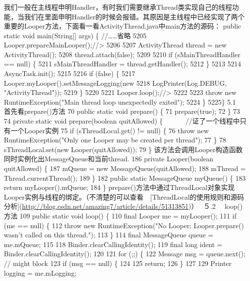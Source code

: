 \documentclass[9pt, b5paper]{article}
\begin{document}
\subsubsection{}
\label{sec-6-0-5}
我们一般在主线程申明Handler，有时我们需要继承Thread类实现自己的线程功能，当我们在里面申明Handler的时候会报错。其原因是主线程中已经实现了两个重要的Looper方法，下面看一看ActivityThread.java中main方法的源码：
public static void main(String[] args) \{
            //\ldots{}\ldots{}省略
5205        Looper.prepareMainLooper();//>
5206
5207        ActivityThread thread = new ActivityThread();
5208        thread.attach(false);
5209
5210        if (sMainThreadHandler == null) \{
5211            sMainThreadHandler = thread.getHandler();
5212        \}
5213
5214        AsyncTask.init();
5215
5216        if (false) \{
5217            Looper.myLooper().setMessageLogging(new
5218   LogPrinter(Log.DEBUG, "ActivityThread"));
5219        \}
5220
5221        Looper.loop();//>
5222
5223        throw new RuntimeException("Main thread loop unexpectedly exited");
5224    \}
5225\}
5.1　首先看prepare()方法
70     public static void prepare() \{
71         prepare(true);
72     \}
73 
74     private static void prepare(boolean quitAllowed) \{
　　　//证了一个线程中只有一个Looper实例
75         if (sThreadLocal.get() != null) \{
76             throw new RuntimeException("Only one Looper may be created per thread");
77         \}
78         sThreadLocal.set(new Looper(quitAllowed));
79     \}
该方法会调用Looper构造函数同时实例化出MessageQueue和当前thread.
186    private Looper(boolean quitAllowed) \{
187        mQueue = new MessageQueue(quitAllowed);
188        mThread = Thread.currentThread();
189    \} 
182    public static MessageQueue myQueue() \{
183        return myLooper().mQueue;
184    \}
prepare()方法中通过ThreadLocal对象实现Looper实例与线程的绑定。（不清楚的可以查看　[ThreadLocal的使用规则和源码分析](\url{http://blog.csdn.net/amazing7/article/details/51313851})）　
５.2 　loop()方法
109    public static void loop() \{
110        final Looper me = myLooper();
111        if (me == null) \{
112            throw new RuntimeException("No Looper; Looper.prepare() wasn't called on this thread.");
113        \}
114        final MessageQueue queue = me.mQueue;
115
118        Binder.clearCallingIdentity();
119        final long ident = Binder.clearCallingIdentity();
120
121        for (;;) \{
122            Message msg = queue.next(); // might block
123            if (msg == null) \{
124               
125                return;
126            \}
127
129            Printer logging = me.mLogging;
\end{document}
